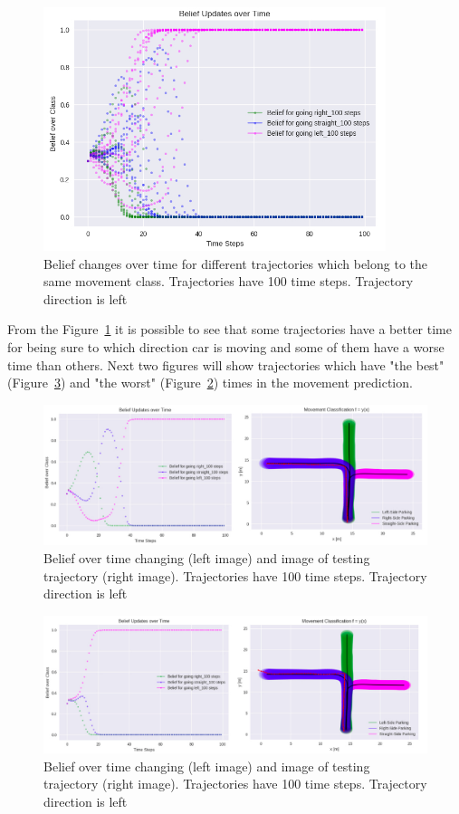 \begin{figure}[h]
	\centering  	
	\includegraphics[width=10cm]{img/10_lefts.jpg}
	\caption{Belief changes over time for different trajectories which belong to the same movement class. Trajectories have 100 time steps. Trajectory direction is left}
	\label{fig:10Left}    
\end{figure}

From the Figure~\ref{fig:10Left} it is possible to see that some trajectories have a better time for being sure to which direction car is moving and some of them have a worse time than others. Next two figures will show trajectories which have "the best" (Figure~\ref{fig:LeftGood}) and "the worst" (Figure~\ref{fig:LeftBad}) times in the movement prediction.

\begin{figure}[h]
	\centering  	
	\includegraphics[width=15cm]{img/bad_left_tr.jpg}
	\caption{Belief over time changing (left image) and image of testing trajectory (right image). Trajectories have 100 time steps. Trajectory direction is left}
	\label{fig:LeftBad}    
\end{figure}

\begin{figure}[h]
	\centering  	
	\includegraphics[width=15cm]{img/good_left_tr.jpg}
	\caption{Belief over time changing (left image) and image of testing trajectory (right image). Trajectories have 100 time steps. Trajectory direction is left}
	\label{fig:LeftGood}    
\end{figure}

